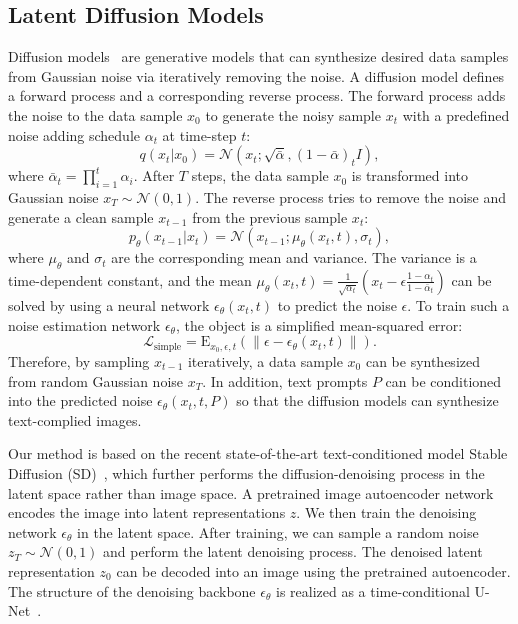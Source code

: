 \documentclass[10pt,twocolumn,letterpaper]{article}
\begin{document}
\subsection{Latent Diffusion Models}
Diffusion models~\cite{ho2020denoising, song2020denoising, nichol2021improved} are generative models that can synthesize desired data samples from Gaussian noise via iteratively removing the noise. 
A diffusion model defines a forward process and a corresponding reverse process. The forward process adds the noise to the data sample $x_0$ to generate the noisy sample $x_t$ with a predefined noise adding schedule $\alpha_t$ at time-step $t$:
\begin{equation}
    \label{eq:diffsuion}
    q(x_t|x_0) = \mathcal{N}(x_t; \sqrt{\bar{\alpha}}, (1 - \bar{\alpha})_t I),
\end{equation}
where $\bar\alpha_t = \prod_{i=1}^{t}\alpha_i$. After $T$ steps, the data sample $x_0$ is transformed into Gaussian noise ${x}_T \sim \mathcal{N}(0, 1)$. The reverse process tries to remove the noise and generate a clean sample $x_{t-1}$ from the previous sample $x_t$:
\begin{equation}
    \label{eq:denoise}
    p_\theta(x_{t-1}|x_t) = \mathcal{N}(x_{t-1}; \mu_{\theta}(x_t, t), \sigma_t),
\end{equation}
where $\mu_\theta$ and $\sigma_t$ are the corresponding mean and variance. The variance is a time-dependent constant, and the mean $\mu_\theta(x_t, t) = \frac{1}{\sqrt{\alpha_t}}(x_t - \epsilon\frac{1-\alpha_t}{1-\bar\alpha_t})$ can be solved by using a neural network $\epsilon_\theta(x_t, t)$ to predict the noise $\epsilon$. To train such a noise estimation network $\epsilon_\theta$, the object is a simplified mean-squared error:
\begin{equation}
    \label{eq:objective}
    \mathcal{L}_{\text{simple}} = \mathrm{E}_{x_0, \epsilon, t}(\| \epsilon - \epsilon_\theta(x_t, t) \|).
\end{equation}
Therefore, by sampling $x_{t-1}$ iteratively, a data sample $x_0$ can be synthesized from random Gaussian noise $x_T$. In addition, text prompts $P$ can be conditioned into the predicted noise $\epsilon_\theta(x_t, t, P)$ so that the diffusion models can synthesize text-complied images. 

Our method is based on the recent state-of-the-art text-conditioned model Stable Diffusion (SD)~\cite{rombach2022high}, which further performs the diffusion-denoising process in the latent space rather than image space. A pretrained image autoencoder network encodes the image into latent representations $z$.
We then train the denoising network $\epsilon_\theta$ in the latent space. After training, we can sample a random noise $z_T \sim \mathcal{N}(0, 1)$ and perform the latent denoising process. The denoised latent representation $z_0$ can be decoded into an image using the pretrained autoencoder. The structure of the denoising backbone $\epsilon_\theta$ is realized as a time-conditional U-Net~\cite{ronneberger2015unet}. 
\end{document}
